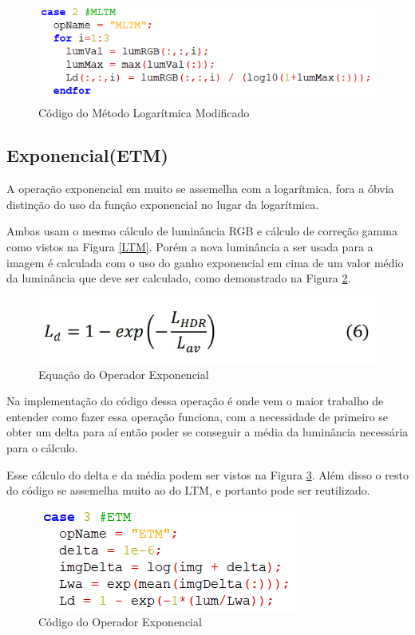 \documentclass[conference]{IEEEtran}
\begin{document}
\begin{figure}[!htpb]
    \centering
    \includegraphics[scale=.40]{Imagens/mltmcod.png}
    \caption{Código do Método Logarítmica Modificado}
    \label{MLTM2}
\end{figure}

\subsection{Exponencial(ETM)}

A operação exponencial em muito se assemelha com a logarítmica, fora a óbvia distinção do uso da função exponencial no lugar da logarítmica. 

Ambas usam o mesmo cálculo de luminância RGB e cálculo de correção gamma como vistos na Figura \ref{LTM}.
Porém a nova luminância a ser usada para a imagem é calculada com o uso do ganho exponencial em cima de um valor médio da luminância que deve ser calculado, como demonstrado na Figura \ref{ETM}.

\begin{figure}[!htpb]
    \centering
    \includegraphics[scale=.45]{Imagens/etm.jpg}
    \caption{Equação do Operador Exponencial}
    \label{ETM}
\end{figure}

Na implementação do código dessa operação é onde vem o maior trabalho de entender como fazer essa operação funciona, com a necessidade de primeiro se obter um delta para aí então poder se conseguir a média da luminância necessária para o cálculo.

Esse cálculo do delta e da média podem ser vistos na Figura \ref{ETM2}. Além disso o resto do código se assemelha muito ao do LTM, e portanto pode ser reutilizado.

\begin{figure}[!htpb]
    \centering
    \includegraphics[scale=.45]{Imagens/etmcod.png}
    \caption{Código do Operador Exponencial}
    \label{ETM2}
\end{figure}
\end{document}
